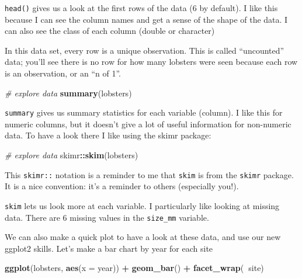 \documentclass[]{book}
\newenvironment{Shaded}{\begin{snugshade}}{\end{snugshade}}
\newcommand{\CommentTok}[1]{\textcolor[rgb]{0.56,0.35,0.01}{\textit{#1}}}
\newcommand{\DataTypeTok}[1]{\textcolor[rgb]{0.13,0.29,0.53}{#1}}
\newcommand{\KeywordTok}[1]{\textcolor[rgb]{0.13,0.29,0.53}{\textbf{#1}}}
\newcommand{\NormalTok}[1]{#1}
\newcommand{\OperatorTok}[1]{\textcolor[rgb]{0.81,0.36,0.00}{\textbf{#1}}}
\newcommand{\StringTok}[1]{\textcolor[rgb]{0.31,0.60,0.02}{#1}}
\begin{document}
\texttt{head()} gives us a look at the first rows of the data (6 by default). I like this because I can see the column names and get a sense of the shape of the data. I can also see the class of each column (double or character)

In this data set, every row is a unique observation. This is called ``uncounted'' data; you'll see there is no row for how many lobsters were seen because each row is an observation, or an ``n of 1''.

\begin{Shaded}
\begin{Highlighting}[]
\CommentTok{# explore data}
\KeywordTok{summary}\NormalTok{(lobsters) }
\end{Highlighting}
\end{Shaded}

\texttt{summary} gives us summary statistics for each variable (column). I like this for numeric columns, but it doesn't give a lot of useful information for non-numeric data. To have a look there I like using the skimr package:

\begin{Shaded}
\begin{Highlighting}[]
\CommentTok{# explore data}
\NormalTok{skimr}\OperatorTok{::}\KeywordTok{skim}\NormalTok{(lobsters) }
\end{Highlighting}
\end{Shaded}

This \texttt{skimr::} notation is a reminder to me that \texttt{skim} is from the \texttt{skimr} package. It is a nice convention: it's a reminder to others (especially you!).

\texttt{skim} lets us look more at each variable. I particularly like looking at missing data. There are 6 missing values in the \texttt{size\_mm} variable.

We can also make a quick plot to have a look at these data, and use our new ggplot2 skills. Let's make a bar chart by year for each site

\begin{Shaded}
\begin{Highlighting}[]
\KeywordTok{ggplot}\NormalTok{(lobsters, }\KeywordTok{aes}\NormalTok{(}\DataTypeTok{x =}\NormalTok{ year)) }\OperatorTok{+}
\StringTok{  }\KeywordTok{geom_bar}\NormalTok{() }\OperatorTok{+}
\StringTok{  }\KeywordTok{facet_wrap}\NormalTok{(}\OperatorTok{~}\NormalTok{site)}
\end{Highlighting}
\end{Shaded}
\end{document}
